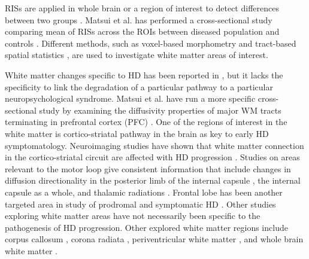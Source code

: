 RISs are applied in whole brain or a region of interest to detect differences between two groups \cite{Snook2007}. Matsui et al. has performed a cross-sectional study comparing mean of RISs across the ROIs between diseased population and controls \cite{Matsui2014}. Different methods, such as voxel-based morphometry \cite{Ashburner2000} and tract-based spatial statistics \cite{Smith2006}, are used to investigate white matter areas of interest.

White matter changes specific to HD has been reported in \cite{Douaud2009}, but it lacks the specificity to link the degradation of a particular pathway to a particular neuropsychological syndrome. Matsui et al. have run a more specific cross-sectional study by examining the diffusivity properties of major WM tracts terminating in prefrontal cortex (PFC) \cite{Matsui2014}.
One of the regions of interest in the white matter is cortico-striatal pathway in the brain as key to early HD symptomatology. Neuroimaging studies have shown that white matter connection in the cortico-striatal circuit are affected with HD progression
\cite{Weaver2009, Beglinger2005, Douaud2009}. Studies on areas relevant to the motor loop give consistent information that include changes in diffusion directionality in the posterior limb of the internal capsule \cite{Rosas2006, DellaNave2010}, the internal capsule as a whole, and thalamic radiations \cite{Stoffers2010, Bohanna2011}. Frontal lobe has been another targeted area in study of prodromal and symptomatic HD \cite{Reading2005, Rosas2006, DellaNave2010}. Other studies exploring white matter areas have not necessarily been specific to the pathogenesis of HD progression. Other explored white matter regions include corpus callosum \cite{Rosas2006, DellaNave2010, Stoffers2010, Bohanna2011, Weaver2009, Sritharan2010, Muller2011, DiPaola2012, Dumas2012}, corona radiata \cite{DellaNave2010, Stoffers2010, Bohanna2011, Weaver2009}, periventricular white matter \cite{Mascalchi2004}, and whole brain white matter \cite{Rosas2006, Mascalchi2004}.
\newline